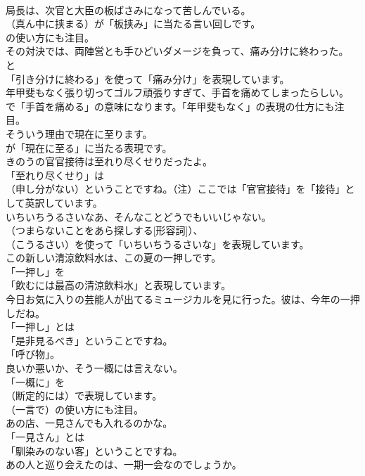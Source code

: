 \documentclass[8pt]{extreport}
\begin{document}
\begin{CJK}{UTF8}{min}
\\	局長は、次官と大臣の板ばさみになって苦しんでいる。 
\\	（真ん中に挟まる）が「板挟み」に当たる言い回しです。
\\	の使い方にも注目。	
\\	その対決では、両陣営とも手ひどいダメージを負って、痛み分けに終わった。 
\\	と
\\	「引き分けに終わる」を使って「痛み分け」を表現しています。	
\\	年甲斐もなく張り切ってゴルフ頑張りすぎて、手首を痛めてしまったらしい。 
\\	で「手首を痛める」の意味になります。「年甲斐もなく」の表現の仕方にも注目。	
\\	そういう理由で現在に至ります。 
\\	が「現在に至る」に当たる表現です。	
\\	きのうの官官接待は至れり尽くせりだったよ。 
\\	「至れり尽くせり」は 
\\	（申し分がない）ということですね。（注）ここでは「官官接待」を「接待」として英訳しています。	
\\	いちいちうるさいなあ、そんなことどうでもいいじゃない。 
\\	（つまらないことをあら探しする[形容詞]）、
\\	（こうるさい）を使って「いちいちうるさいな」を表現しています。	
\\	この新しい清涼飲料水は、この夏の一押しです。 
\\	「一押し」を
\\	「飲むには最高の清涼飲料水」と表現しています。	
\\	今日お気に入りの芸能人が出てるミュージカルを見に行った。彼は、今年の一押しだね。 
\\	「一押し」とは
\\	「是非見るべき」ということですね。
\\	「呼び物」。	
\\	良いか悪いか、そう一概には言えない。 
\\	「一概に」を 
\\	（断定的には）で表現しています。
\\	（一言で）の使い方にも注目。	
\\	あの店、一見さんでも入れるのかな。 
\\	「一見さん」とは
\\	「馴染みのない客」ということですね。	
\\	あの人と巡り会えたのは、一期一会なのでしょうか。 

\end{CJK}
\end{document}
